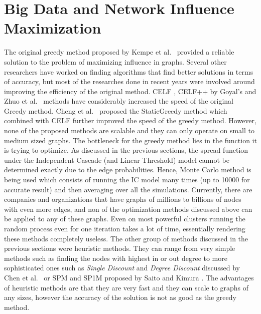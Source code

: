 \documentclass[english]{tktltiki}
\begin{document}
\newpage

\section{Big Data and Network Influence Maximization}
\label{sec:bigdatanetworkinfluelncemaximization}
The original greedy method proposed by Kempe et al.\ \cite{kempe03} provided a reliable solution to the problem of maximizing influence in graphs. Several other researchers have worked on finding algorithms that find better solutions in terms of accuracy, but most of the researches done in recent years were involved around improving the efficiency of the original method. CELF \cite{leskovec07},  CELF++ by Goyal's \cite{goyal112} and Zhuo et al.\ \cite{zhuo13} methods have considerably increased the speed of the original Greedy method. Cheng et al.\ \cite{cheng13} proposed the StaticGreedy method which combined with CELF further improved the speed of the greedy method.  However, none of the proposed methods are scalable and they can only operate on small to medium sized graphs. The bottleneck for the greedy method lies in the function it is trying to optimize.  As discussed in the previous sections, the spread function under the Independent Cascade (and Linear Threshold) model cannot be determined exactly due to the edge probabilities. Hence, Monte Carlo method is being used which consists of running the IC model many times (up to 10000 for accurate result) and then averaging over all the simulations. Currently, there are companies and organizations that have graphs of millions to billions of nodes with even more edges, and non of the optimization methods discussed above can be applied to any of these graphs. Even on most powerful clusters running the random process even for one iteration takes a lot of time, essentially rendering these methods completely useless. The other group of methods discussed in the previous sections were heuristic methods. They can range from very simple methods such as finding the nodes with highest in or out degree to more sophisticated ones such as \textit{Single Discount} and \textit{Degree Discount} discussed by Chen et al.\ \cite{chen09} or SPM and SP1M proposed by Saito and Kimura \cite{kimura06}. The advantages of heuristic methods are that they are very fast and they can scale to graphs of any sizes, however the accuracy of the solution is not as good as the greedy method. 
\\
\end{document}
